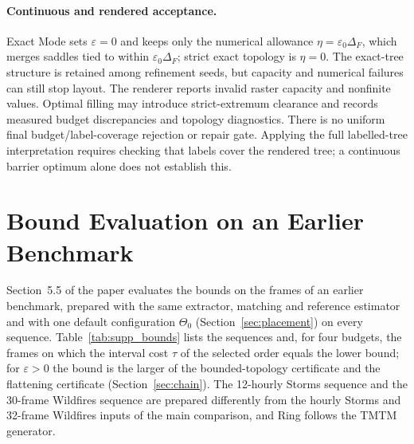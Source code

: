 \documentclass[10pt]{article}
\begin{document}
\paragraph{Continuous and rendered acceptance.}
Exact Mode sets $\varepsilon=0$ and keeps only the numerical allowance $\eta=\varepsilon_0\Delta_F$, which merges saddles tied to within $\varepsilon_0\Delta_F$; strict exact topology is $\eta=0$. The exact-tree structure is retained among refinement seeds, but capacity and numerical failures can still stop layout. The renderer reports invalid raster capacity and nonfinite values. Optimal filling may introduce strict-extremum clearance and records measured budget discrepancies and topology diagnostics. There is no uniform final budget/label-coverage rejection or repair gate. Applying the full labelled-tree interpretation requires checking that labels cover the rendered tree; a continuous barrier optimum alone does not establish this.


\section{Bound Evaluation on an Earlier Benchmark}\label{sec:supp_bounds}
Section~5.5 of the paper evaluates the bounds on the frames of an earlier benchmark, prepared with the same extractor, matching and reference estimator and with one default configuration $\Theta_0$ (Section~\ref{sec:placement}) on every sequence. Table~\ref{tab:supp_bounds} lists the sequences and, for four budgets, the frames on which the interval cost $\tau$ of the selected order equals the lower bound; for $\varepsilon>0$ the bound is the larger of the bounded-topology certificate and the flattening certificate (Section~\ref{sec:chain}). The 12-hourly Storms sequence and the 30-frame Wildfires sequence are prepared differently from the hourly Storms and 32-frame Wildfires inputs of the main comparison, and Ring follows the TMTM generator.
\end{document}
